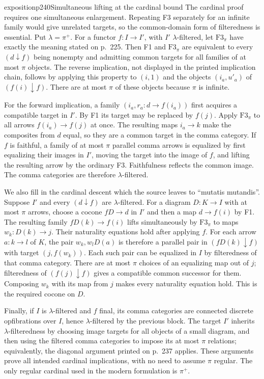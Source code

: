 \begin{dcomment}{exposition}{p240}{Simultaneous lifting at the cardinal bound}
The cardinal proof requires one simultaneous enlargement.  Repeating F3 separately for an infinite family would give unrelated targets, so the common-domain form of filteredness is essential.  Put $\lambda=\pi^+$.  For a functor $f:I\to I'$, with $I'$ $\lambda$-filtered, let $\mathrm{F3}_\pi$ have exactly the meaning stated on p.~225.  Then F1 and $\mathrm{F3}_\pi$ are equivalent to every $(d\downarrow f)$ being nonempty and admitting common targets for all families of at most $\pi$ objects.  The reverse implication, not displayed in the printed implication chain, follows by applying this property to $(i,1)$ and the objects $(i_a,u'_a)$ of $(f(i)\downarrow f)$.  There are at most $\pi$ of these objects because $\pi$ is infinite.

For the forward implication, a family $(i_a,r_a:d\to f(i_a))$ first acquires a compatible target in $I'$.  By F1 its target may be replaced by $f(j)$.  Apply $\mathrm{F3}_\pi$ to all arrows $f(i_a)\to f(j)$ at once.  The resulting maps $i_a\to k$ make the composites from $d$ equal, so they are a common target in the comma category.  If $f$ is faithful, a family of at most $\pi$ parallel comma arrows is equalized by first equalizing their images in $I'$, moving the target into the image of $f$, and lifting the resulting arrow by the ordinary F3.  Faithfulness reflects the common image.  The comma categories are therefore $\lambda$-filtered.

We also fill in the cardinal descent which the source leaves to ``mutatis mutandis''.  Suppose $I'$ and every $(d\downarrow f)$ are $\lambda$-filtered.  For a diagram $D:K\to I$ with at most $\pi$ arrows, choose a cocone $fD\to d$ in $I'$ and then a map $d\to f(i)$ by F1.  The resulting family $fD(k)\to f(i)$ lifts simultaneously by $\mathrm{F3}_\pi$ to maps $w_k:D(k)\to j$.  Their naturality equations hold after applying $f$.  For each arrow $a:k\to l$ of $K$, the pair $w_k,w_lD(a)$ is therefore a parallel pair in $(fD(k)\downarrow f)$ with target $(j,f(w_k))$.  Each such pair can be equalized in $I$ by filteredness of that comma category.  There are at most $\pi$ choices of an equalizing map out of $j$; filteredness of $(f(j)\downarrow f)$ gives a compatible common successor for them.  Composing $w_k$ with its map from $j$ makes every naturality equation hold.  This is the required cocone on $D$.

Finally, if $I$ is $\lambda$-filtered and $f$ final, its comma categories are connected discrete opfibrations over $I$, hence $\lambda$-filtered by the previous block.  The target $I'$ inherits $\lambda$-filteredness by choosing image targets for all objects of a small diagram, and then using the filtered comma categories to impose its at most $\pi$ relations; equivalently, the diagonal argument printed on p.~237 applies.  These arguments prove all intended cardinal implications, with no need to assume $\pi$ regular.  The only regular cardinal used in the modern formulation is $\pi^+$.
\end{dcomment}

